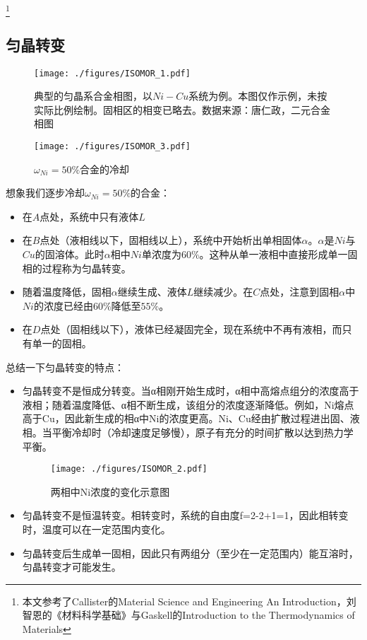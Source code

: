 \footnote{本文参考了Callister的Material Science and Engineering An Introduction，刘智恩的《材料科学基础》与Gaskell的Introduction to the Thermodynamics of Materials}

\subsection{匀晶转变}

\begin{figure}[ht]
\centering
\texttt{[image: ./figures/ISOMOR\_1.pdf]}
\caption{典型的匀晶系合金相图，以$Ni-Cu$系统为例。本图仅作示例，未按实际比例绘制。固相区的相变已略去。数据来源：唐仁政，二元合金相图} \label{ISOMOR_fig1}
\end{figure}

\begin{figure}[ht]
\centering
\texttt{[image: ./figures/ISOMOR\_3.pdf]}
\caption{$\omega_{Ni}=50\%$合金的冷却} \label{ISOMOR_fig3}
\end{figure}


想象我们逐步冷却$\omega_{Ni}=50\%$的合金：
\begin{itemize}
\item 在$A$点处，系统中只有液体$L$
\item 在$B$点处（液相线以下，固相线以上），系统中开始析出单相固体$\alpha$。$\alpha$是$Ni$与$Cu$的固溶体。此时$\alpha$相中$Ni$单浓度为$60\%$。这种从单一液相中直接形成单一固相的过程称为匀晶转变。
\item 随着温度降低，固相$\alpha$继续生成、液体$L$继续减少。在$C$点处，注意到固相$\alpha$中$Ni$的浓度已经由$60\%$降低至$55\%$。
\item 在$D$点处（固相线以下），液体已经凝固完全，现在系统中不再有液相，而只有单一的固相。

\end{itemize}

总结一下匀晶转变的特点：
\begin{itemize}
\item 匀晶转变不是恒成分转变。当α相刚开始生成时，α相中高熔点组分的浓度高于液相；随着温度降低、α相不断生成，该组分的浓度逐渐降低。例如，Ni熔点高于Cu，因此新生成的相α中Ni的浓度更高。Ni、Cu经由扩散过程进出固、液相。当平衡冷却时（冷却速度足够慢），原子有充分的时间扩散以达到热力学平衡。

\begin{figure}[ht]
\centering
\texttt{[image: ./figures/ISOMOR\_2.pdf]}
\caption{两相中Ni浓度的变化示意图} \label{ISOMOR_fig2}
\end{figure}

\item 匀晶转变不是恒温转变。相转变时，系统的自由度f=2-2+1=1，因此相转变时，温度可以在一定范围内变化。
\item 匀晶转变后生成单一固相，因此只有两组分（至少在一定范围内）能互溶时，匀晶转变才可能发生。
\end{itemize}

